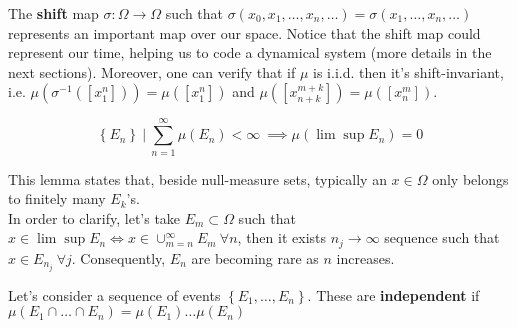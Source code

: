 The \textbf{shift} map $\sigma : \Omega \to \Omega$ such that $\sigma\left(x_0, x_1, \ldots, x_n, \ldots\right) = \sigma\left(x_1, \ldots, x_n, \ldots\right)$ represents an important map over our space.
Notice that the shift map could represent our time, helping us to code a dynamical system (more details in the next sections).
Moreover, one can verify that if $\mu$ is i.i.d. then it's shift-invariant, i.e. $\mu\left(\sigma^{-1}\left(\left[x_1^n\right]\right)\right) = \mu\left(\left[x_1^n\right]\right)$ and $\mu\left(\left[x_{n+k}^{m+k}\right]\right) = \mu\left(\left[x_n^m\right]\right)$.

\begin{theorem}
    \begin{equation*}
        \left\{E_n\right\} \ \vert \ \sum_{n=1}^\infty \mu\left(E_n\right) < \infty \ \implies \mu\left(\lim \sup E_n\right) = 0
    \end{equation*}
\end{theorem}
This lemma states that, beside null-measure sets, typically an $x \in \Omega$ only belongs to finitely many $E_k$'s. \\
In order to clarify, let's take $E_m \subset \Omega$ such that $x \in \lim \sup E_n \Leftrightarrow x \in \cup_{m=n}^\infty E_m \ \forall n$, then it exists $n_j \to \infty$ sequence such that $x \in E_{n_j} \ \forall j$.
Consequently, $E_n$ are becoming rare as $n$ increases.

\begin{definition}
    Let's consider a sequence of events $\left\{E_1, \ldots, E_n\right\}$.
    These are \textbf{independent} if $\mu\left(E_1 \cap \ldots \cap E_n\right) = \mu\left(E_1\right) \ldots \mu\left(E_n\right)$
\end{definition}